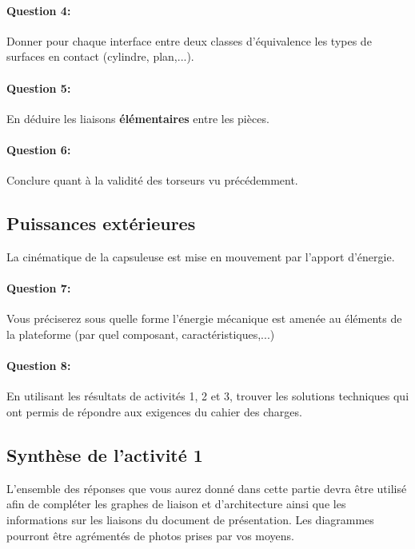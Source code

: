 \paragraph{Question 4:} Donner pour chaque interface entre deux classes d'équivalence les types de surfaces en contact (cylindre, plan,...).

\reponse[3]

\paragraph{Question 5:} En déduire les liaisons \textbf{élémentaires} entre les pièces.

\reponse[3]

\paragraph{Question 6:} Conclure quant à la validité des torseurs vu précédemment.

\reponse[3]

\subsection{Puissances extérieures}

La cinématique de la capsuleuse est mise en mouvement par l'apport d'énergie.

\paragraph{Question 7:} Vous préciserez sous quelle forme l'énergie mécanique est amenée au éléments de la plateforme (par quel composant, caractéristiques,...)

\reponse[3]

\paragraph{Question 8:} En utilisant les résultats de activités 1, 2 et 3, trouver les solutions techniques qui ont permis de répondre aux exigences du cahier des charges.

\subsection{Synthèse de l'activité 1}

L'ensemble des réponses que vous aurez donné dans cette partie devra être utilisé afin de compléter les graphes de liaison et d'architecture ainsi que les informations sur les liaisons du document de présentation. Les diagrammes pourront être agrémentés de photos prises par vos moyens.

